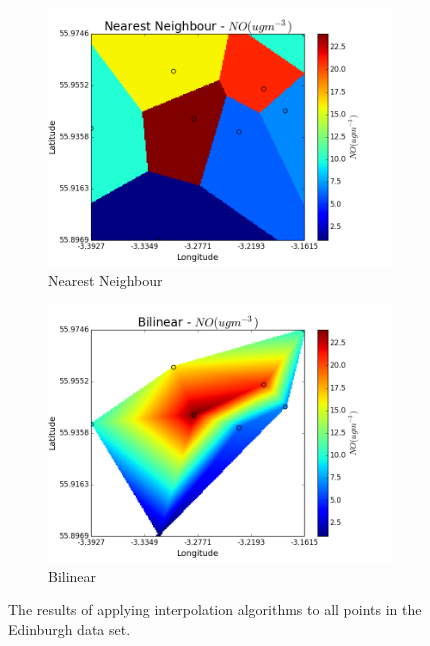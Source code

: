 			\begin{figure}[H]
                \centering
                \begin{subfigure}{0.7\textwidth}
                    \centering
                    \includegraphics[width=\linewidth]{./images/Edinburgh_Nearest_Neighbour.png}
                    \caption{Nearest Neighbour}
                    \label{fig:edinburgh_nearest_neighbour}
                \end{subfigure}
                \begin{subfigure}{0.7\textwidth}
                    \includegraphics[width=\linewidth]{./images/Edinburgh_Bilinear.png}
                    \caption{Bilinear}
                    \label{fig:edinburgh_bilinear}
                \end{subfigure}
                \caption{The results of applying interpolation algorithms to all points in the Edinburgh data set.}
                \label{fig:edinburgh_example}
            \end{figure}

